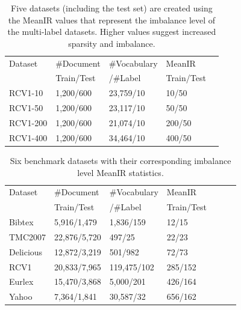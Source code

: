 \documentclass[letterpaper]{article} %
\begin{document}
\begin{table}[!t]
  \centering
  \begin{tabular}{lllll}
    \toprule
  Dataset     & \#Document   & \#Vocabulary  & MeanIR \\
             & Train/Test   & /\#Label  & Train/Test \\
    \midrule
    RCV1-10     & 1,200/600 & 23,759/10  & 10/50 \\
    RCV1-50      & 1,200/600 & 23,117/10  & 50/50\\
   RCV1-200      & 1,200/600 & 21,074/10  & 200/50 \\
   RCV1-400      & 1,200/600 & 34,464/10 & 400/50 \\
    \bottomrule
  \end{tabular}
    \caption{Five datasets (including the test set) are created using the MeanIR values that represent the imbalance level of the multi-label datasets. Higher values suggest increased sparsity and imbalance.} 
  \label{tab:syndataset-table}
\end{table}
\begin{table}[!tb]
  \centering
  \begin{tabular}{lllllll}
    \toprule
            
    Dataset     & \#Document   & \#Vocabulary    & MeanIR \\
             & Train/Test   & /\#Label & Train/Test \\
    \midrule
      Bibtex     & 5,916/1,479 & 1,836/159  & 12/15 \\
    TMC2007   & 22,876/5,720 & 497/25  & 22/23 \\
      Delicious     & 12,872/3,219 & 501/982  & 72/73 \\
    RCV1     & 20,833/7,965 & 119,475/102  & 285/152 \\
    Eurlex  & 15,470/3,868 & 5,000/201  &  426/164 \\
    Yahoo   & 7,364/1,841 & 30,587/32  & 656/162 \\
   
    \bottomrule
  \end{tabular}
    \caption{Six benchmark datasets with their corresponding imbalance level MeanIR statistics. }
  \label{tab:dataset-table}
\end{table}
\end{document}
